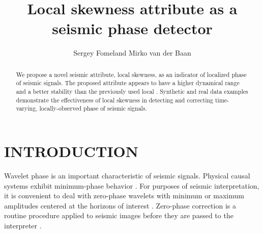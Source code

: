 

\title{Local skewness attribute as a seismic phase detector}

\renewcommand{\thefootnote}{\fnsymbol{footnote}}


\author{Sergey Fomel\footnotemark[1]
and Mirko van der Baan\footnotemark[2]}

\address{
\footnotemark[1]Bureau of Economic Geology, \\
John A. and Katherine G. Jackson School of Geosciences \\
The University of Texas at Austin \\
University Station, Box X \\
Austin, TX 78713-8924 \\
USA \\
sergey.fomel@beg.utexas.edu \\
\footnotemark[2]Department of Physics \\
University of Alberta \\
CEB 11322 - 89 Avenue \\
Edmonton, Alberta T6G 2G7 \\
Canada \\
Mirko.VanderBaan@ualberta.ca
}

\maketitle

\begin{abstract}
  We propose a novel seismic attribute, local skewness, as an indicator
  of localized phase of seismic signals. The proposed attribute
  appears to have a higher dynamical range and a better stability than
  the previously used local  . Synthetic and real data
  examples demonstrate the effectiveness of local skewness in
  detecting and correcting time-varying, locally-observed phase of
  seismic signals.
\end{abstract}

\section{INTRODUCTION}

Wavelet phase is an important characteristic of seismic
signals. Physical causal systems exhibit minimum-phase behavior
\cite[]{robinson}. For purposes of seismic interpretation, it is
convenient to deal with zero-phase wavelets with minimum or maximum
amplitudes centered at the horizons of interest . Zero-phase
correction is  a routine procedure applied to seismic
images before they are passed to the interpreter \cite[]{brown}.

